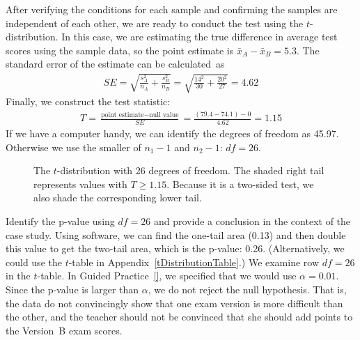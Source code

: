 After verifying the conditions for each sample and confirming the samples are independent of each other, we are ready to conduct the test using the $t$-distribution. In this case, we are estimating the true difference in average test scores using the sample data, so the point estimate is $\bar{x}_A - \bar{x}_B = 5.3$. The standard error of the estimate can be calculated~as
\begin{align*}
SE
  = \sqrt{\frac{s_A^2}{n_A} + \frac{s_B^2}{n_B}}
  = \sqrt{\frac{14^2}{30} + \frac{20^2}{27}}
  = 4.62
\end{align*}
Finally, we construct the test statistic:
\begin{align*}
T
  = \frac{\text{point estimate} - \text{null value}}{SE}
  = \frac{(79.4-74.1) - 0}{4.62}
  = 1.15
\end{align*}
If we have a computer handy, we can identify the degrees
of freedom as 45.97.
Otherwise we use the smaller of $n_1-1$ and $n_2-1$: $df=26$. 

\begin{figure}[h]
  \centering
  \caption{The $t$-distribution with 26 degrees of freedom.
      The shaded right tail represents values with $T \geq 1.15$.
      Because it is a two-sided test, we also shade the
      corresponding lower tail.}
  \label{pValueOfTwoTailAreaOfExamVersionsWhereDFIs26}
\end{figure}

\begin{examplewrap}
\begin{nexample}{Identify the p-value using $df = 26$
    and provide a conclusion in the context of the case study.}
  Using software, we can find the one-tail area (0.13)
  and then double this value to get the two-tail area,
  which is the p-value: 0.26.
  (Alternatively, we could use the $t$-table in
  Appendix~\ref{tDistributionTable}.)
  We examine row $df=26$ in the $t$-table.
  In Guided Practice~\ref{},
  we specified that we would use $\alpha = 0.01$.
  Since the p-value is larger than $\alpha$,
  we do not reject the null hypothesis.
  That is, the data do not convincingly show that one exam
  version is more difficult than the other, and the teacher
  should not be convinced that she should add points to the
  Version~B exam scores.
\end{nexample}
\end{examplewrap}


